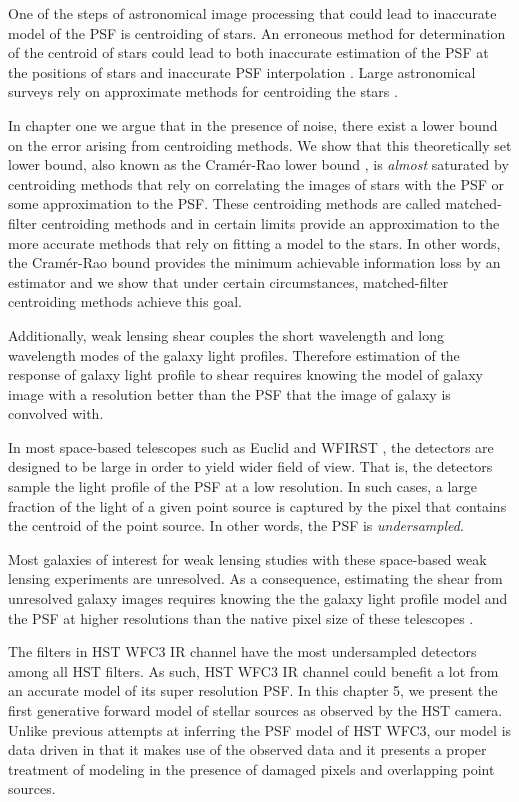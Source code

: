 One of the steps of astronomical image processing that could lead to inaccurate model of the PSF is centroiding 
of stars. An erroneous method for determination of the centroid of stars could lead to both inaccurate estimation of the 
PSF at the positions of stars and inaccurate PSF interpolation \citep{anderson2000,sdss,anderson2003,desc}. Large astronomical surveys rely on approximate 
methods for centroiding the stars \citep{sextractor,sdss,des}. 

In chapter one we argue that in the presence of noise, there exist
a lower bound on the error arising from centroiding methods. We show that this theoretically set lower bound, also known as the Cram\'{e}r-Rao lower bound \citep{lecam}, 
is \emph{almost} saturated by centroiding methods that rely on correlating the images of stars with the PSF or some approximation to the 
PSF. These centroiding methods are called matched-filter centroiding methods and in certain limits provide an approximation to the more accurate 
methods that rely on fitting a model to the stars. In other words, the Cram\'{e}r-Rao bound provides the minimum achievable information loss by an estimator and 
we show that under certain circumstances, matched-filter centroiding methods achieve this goal.

Additionally, weak lensing shear couples the short wavelength and long wavelength modes of the galaxy light profiles. 
Therefore estimation of the response of galaxy light profile to shear requires knowing the model of galaxy image 
with a resolution better than the PSF that the image of galaxy is convolved with. 

In most space-based telescopes such as Euclid \citep{euclid} and WFIRST \citep{wfirst}, the detectors are designed to be large in order to yield wider field of view. 
That is, the detectors sample the light profile of the PSF at a low resolution. In such cases, a large fraction of the light of a given point source 
is captured by the pixel that contains the centroid of the point source. In other words, the PSF is \emph{undersampled}.

Most galaxies of interest for weak lensing studies with these space-based weak lensing experiments are unresolved. 
As a consequence, estimating the shear from unresolved galaxy images requires 
knowing the the galaxy light profile model and the PSF at higher resolutions than the native pixel size of these telescopes \citep{olic,ngole2}.

The filters in HST WFC3 IR channel have the most undersampled detectors among all HST filters. 
As such, HST WFC3 IR channel could benefit a lot from an accurate model of its super resolution PSF. 
In this chapter 5, we present the first generative forward model of stellar sources as observed by the HST camera.
Unlike previous attempts at inferring the PSF model of HST WFC3, our model is data driven in that it makes 
use of the observed data and it presents a proper treatment of modeling in the presence of damaged pixels and overlapping 
point sources.  

